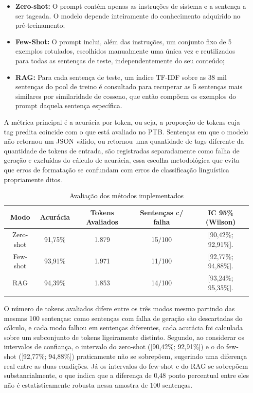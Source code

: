 \documentclass[a4paper,12pt]{article}
\begin{document}
\begin{itemize}
    \item \textbf{Zero-shot:} O prompt contém apenas as instruções de sistema e a sentença a ser tageada. O modelo depende inteiramente do conhecimento adquirido no pré-treinamento;
    \item \textbf{Few-Shot:} O prompt inclui, além das instruções, um conjunto fixo de 5 exemplos rotulados, escolhidos manualmente uma única vez e reutilizados para todas as sentenças de teste, independentemente do seu conteúdo;
    \item \textbf{RAG:} Para cada sentença de teste, um índice TF-IDF sobre as 38 mil sentenças do pool de treino é consultado para recuperar as 5 sentenças mais similares por similaridade de cosseno, que então compõem os exemplos do prompt daquela sentença específica.
\end{itemize}

A métrica principal é a acurácia por token, ou seja, a proporção de tokens cuja tag predita coincide com o que está avaliado no PTB. Sentenças em que o modelo não retornou um JSON válido, ou retornou uma quantidade de tags diferente da quantidade de tokens de entrada, são registradas separadamente como falha de geração e excluídas do cálculo de acurácia, essa escolha metodológica que evita que erros de formatação se confundam com erros de classificação linguística propriamente ditos.

\begin{longtable}[c]{|c|c|c|c|c|}
\hline
\textbf{Modo} & \textbf{Acurácia} & \textbf{Tokens Avaliados} & \textbf{Sentenças c/ falha} & \textbf{IC 95\% (Wilson)} \\
\hline
Zero-shot & 91,75\% & 1.879 & 15/100 & [90,42\%; 92,91\%]. \\
\hline
Few-shot & 93,91\% & 1.971 & 11/100 & [92,77\%; 94,88\%]. \\
\hline
RAG & 94,39\% & 1.853 & 14/100 & [93,24\%; 95,35\%]. \\
\hline
\caption{Avaliação dos métodos implementados}
\end{longtable}

O número de tokens avaliados difere entre os três modos mesmo partindo das mesmas 100 sentenças: como sentenças com falha de geração são descartadas do cálculo, e cada modo falhou em sentenças diferentes, cada acurácia foi calculada sobre um subconjunto de tokens ligeiramente distinto. Segundo, ao considerar os intervalos de confiança, o intervalo do zero-shot ([90,42\%; 92,91\%]) e o do few-shot ([92,77\%; 94,88\%]) praticamente não se sobrepõem, sugerindo uma diferença real entre as duas condições. Já os intervalos do few-shot e do RAG se sobrepõem substancialmente, o que indica que a diferença de 0,48 ponto percentual entre eles não é estatisticamente robusta nessa amostra de 100 sentenças.
\end{document}
